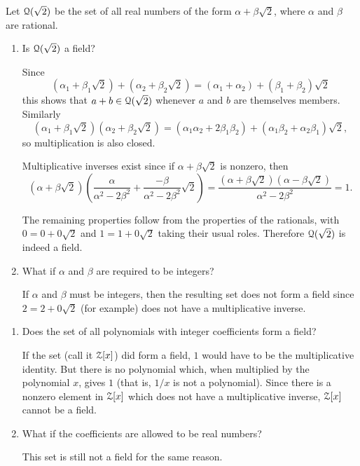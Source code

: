  Let $\mathcal{Q}(\sqrt2)$ be the set of all real numbers of the form
$\alpha + \beta\sqrt2$, where $\alpha$ and $\beta$ are rational.
\begin{enumerate}
\item Is $\mathcal{Q}(\sqrt2)$ a field?
  \begin{solution}
    Since
    \begin{equation*}
      (\alpha_1 + \beta_1\sqrt2) + (\alpha_2 + \beta_2\sqrt2)
      = (\alpha_1 + \alpha_2) + (\beta_1 + \beta_2)\sqrt2
    \end{equation*}
    this shows that $a + b\in\mathcal{Q}(\sqrt2)$ whenever $a$ and $b$ are
    themselves members. Similarly
    \begin{equation*}
      (\alpha_1 + \beta_1\sqrt2)(\alpha_2 + \beta_2\sqrt2)
      = (\alpha_1\alpha_2 + 2\beta_1\beta_2)
      + (\alpha_1\beta_2 + \alpha_2\beta_1)\sqrt2,
    \end{equation*}
    so multiplication is also closed.

    Multiplicative inverses exist since if $\alpha + \beta\sqrt2$ is
    nonzero, then
    \begin{equation*}
      (\alpha + \beta\sqrt2)
      \left(\frac{\alpha}{\alpha^2 - 2\beta^2}
        + \frac{-\beta}{\alpha^2 - 2\beta^2}\sqrt2\right)
      = \frac{(\alpha+\beta\sqrt2)(\alpha-\beta\sqrt2)}
      {\alpha^2 - 2\beta^2} = 1.
    \end{equation*}

    The remaining properties follow from the properties of the
    rationals, with $0 = 0 + 0\sqrt2$ and $1 = 1 + 0\sqrt2$ taking
    their usual roles. Therefore $\mathcal{Q}(\sqrt2)$ is indeed a field.
  \end{solution}
\item What if $\alpha$ and $\beta$ are required to be integers?
  \begin{solution}
    If $\alpha$ and $\beta$ must be integers, then the resulting set
    does not form a field since $2 = 2 + 0\sqrt2$ (for example) does
    not have a multiplicative inverse.
  \end{solution}
\end{enumerate}

\begin{enumerate}
\item Does the set of all polynomials with integer coefficients form a
  field?
  \begin{solution}
    If the set (call it $\mathcal{Z}[x]$) did form a field, $1$ would have to
    be the multiplicative identity. But there is no polynomial which,
    when multiplied by the polynomial $x$, gives $1$ (that is, $1/x$
    is not a polynomial). Since there is a nonzero element in $\mathcal{Z}[x]$
    which does not have a multiplicative inverse, $\mathcal{Z}[x]$ cannot be a
    field.
  \end{solution}
\item What if the coefficients are allowed to be real numbers?
  \begin{solution}
    This set is still not a field for the same reason.
  \end{solution}
\end{enumerate}
